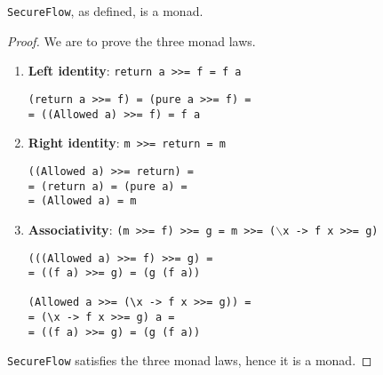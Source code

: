 \begin{proposition}
\texttt{SecureFlow}, as defined, is a monad.
\end{proposition}
\begin{proof}
We are to prove the three monad laws. 
\begin{enumerate}
	\item \textbf{Left identity}: \texttt{return a >>= f = f a}
		\begin{lstlisting}
(return a >>= f) = (pure a >>= f) = 
= ((Allowed a) >>= f) = f a
		\end{lstlisting}
	
	\item \textbf{Right identity}: \texttt{m >>= return = m}
		\begin{lstlisting}
((Allowed a) >>= return) = 
= (return a) = (pure a) = 
= (Allowed a) = m
		\end{lstlisting}
	\item \textbf{Associativity}: \texttt{(m >>= f) >>= g = m >>= ($\backslash$x -> f x >>= g)} 
		\begin{lstlisting}
(((Allowed a) >>= f) >>= g) = 
= ((f a) >>= g) = (g (f a))

(Allowed a >>= (\x -> f x >>= g)) =
= (\x -> f x >>= g) a = 
= ((f a) >>= g) = (g (f a))
		\end{lstlisting}
\end{enumerate}
\texttt{SecureFlow} satisfies the three monad laws, hence it is a monad.
\end{proof}